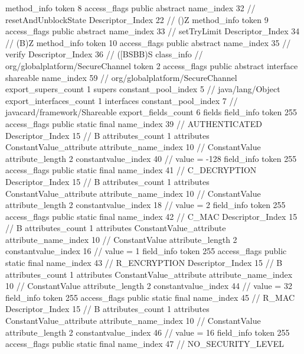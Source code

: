 {{{{{				}
				method_info {
					token	8
					access_flags	public abstract
					name_index	32		// resetAndUnblockState
					Descriptor_Index	22		// ()Z
				}
				method_info {
					token	9
					access_flags	public abstract
					name_index	33		// setTryLimit
					Descriptor_Index	34		// (B)Z
				}
				method_info {
					token	10
					access_flags	public abstract
					name_index	35		// verify
					Descriptor_Index	36		// ([BSBB)S
				}
			}
		}
		class_info {		// org/globalplatform/SecureChannel
			token	2
			access_flags	public abstract interface shareable
			name_index	59		// org/globalplatform/SecureChannel
			export_supers_count	1
			supers {
				constant_pool_index	5		// java/lang/Object
			}
			export_interfaces_count	1
			interfaces {
				constant_pool_index	7		// javacard/framework/Shareable
			}
			export_fields_count	6
			fields {
			field_info {
				token	255
				access_flags	public static final
				name_index	39		// AUTHENTICATED
				Descriptor_Index	15		// B
				attributes_count	1
				attributes {
				ConstantValue_attribute {
					attribute_name_index	10		// ConstantValue
					attribute_length	2
					constantvalue_index	40		// value = -128
				}
				}
			}
			field_info {
				token	255
				access_flags	public static final
				name_index	41		// C_DECRYPTION
				Descriptor_Index	15		// B
				attributes_count	1
				attributes {
				ConstantValue_attribute {
					attribute_name_index	10		// ConstantValue
					attribute_length	2
					constantvalue_index	18		// value = 2
				}
				}
			}
			field_info {
				token	255
				access_flags	public static final
				name_index	42		// C_MAC
				Descriptor_Index	15		// B
				attributes_count	1
				attributes {
				ConstantValue_attribute {
					attribute_name_index	10		// ConstantValue
					attribute_length	2
					constantvalue_index	16		// value = 1
				}
				}
			}
			field_info {
				token	255
				access_flags	public static final
				name_index	43		// R_ENCRYPTION
				Descriptor_Index	15		// B
				attributes_count	1
				attributes {
				ConstantValue_attribute {
					attribute_name_index	10		// ConstantValue
					attribute_length	2
					constantvalue_index	44		// value = 32
				}
				}
			}
			field_info {
				token	255
				access_flags	public static final
				name_index	45		// R_MAC
				Descriptor_Index	15		// B
				attributes_count	1
				attributes {
				ConstantValue_attribute {
					attribute_name_index	10		// ConstantValue
					attribute_length	2
					constantvalue_index	46		// value = 16
				}
				}
			}
			field_info {
				token	255
				access_flags	public static final
				name_index	47		// NO_SECURITY_LEVEL
}}}}}

